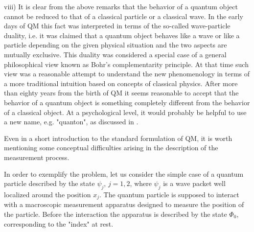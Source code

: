 \documentclass[12pt,reqno]{amsart}
\newcommand{\n}{\relax}
\newcommand{\vs}{\vspace{0.5cm}}
\numberwithin{equation}{section}
\begin{document}
viii)  It is  clear from the above remarks that the behavior of a quantum object  cannot  be reduced to that of a classical particle or a classical wave.  In the early days of QM this fact was interpreted in terms of the so-called wave-particle duality, i.e. it was claimed that  a quantum object behaves like a   wave or like a particle depending on the given physical situation and the two aspects are mutually exclusive. This duality was considered a special case of a  general philosophical view known as Bohr's complementarity principle. At that time such view was a reasonable attempt to understand  the new  phenomenology in terms of a more traditional intuition based on concepts of classical physics.   After more than eighty years from the birth of QM  it seems reasonable to accept that the behavior of  a quantum object is something completely different from the behavior of a classical object. At a psychological  level,   it would  probably be  helpful   to use a new name, e.g.  "quanton", as discussed in \cite{bl}.




\vs
\n
Even in a short introduction to the standard formulation of QM, it is worth mentioning some conceptual difficulties arising in the description of the measurement process. 
 
 
\n 
In order to exemplify the problem, let us consider the simple case of a quantum particle described by the state $\psi_j$, $j=1,2$, where $\psi_j$ is a  wave packet well localized around the position $x_j$. The quantum particle is supposed to interact with a macroscopic measurement apparatus designed to measure the position of the particle. 
Before the interaction the apparatus is described by the state $\Phi_0$, corresponding to the "index" at rest.
 
\end{document}
